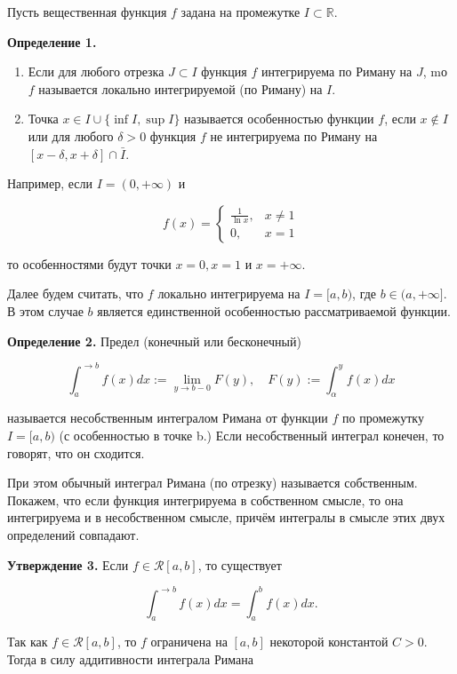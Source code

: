 \documentclass[a4paper,12pt]{article} %
\begin{document}
	Пусть вещественная функция $f$ задана на промежутке $I \subset \mathbb{R}$.
	
	\textbf{Определение 1.}
	\begin{enumerate}
		\item Если для любого отрезка $J \subset I$ функция $f$ интегрируема по Риману на $J$, mо $f$ называется локально интегрируемой (по Риману) на $I$.
	
		\item Точка $x \in I \cup\{\inf I, \sup I\}$ называется особенностью функции $f$, если $x \notin I$ или для любого $\delta>0$ функция $f$ не интегрируема по Риману на $[x-\delta, x+\delta] \cap \bar{I}$.
	
	\end{enumerate}
	
	Например, если $I=(0,+\infty)$ и
	
	$$
	f(x)= \begin{cases}\frac{1}{\ln x}, & x \neq 1 \\ 0, & x=1\end{cases}
	$$
	
	то особенностями будут точки $x=0, x=1$ и $x=+\infty$.
	
	Далее будем считать, что $f$ локально интегрируема на $I=[a, b)$, где $b \in(a,+\infty]$. В этом случае $b$ является единственной особенностью рассматриваемой функции.
	
	\textbf{Определение 2.} Предел (конечный или бесконечный)
	
	$$
	\int_{a}^{\rightarrow b} f(x) d x:=\lim _{y \rightarrow b-0} F(y), \quad F(y):=\int_{\alpha}^{y} f(x) d x
	$$
	
	называется несобственным интегралом Римана от функции $f$ по промежутку $I=[a, b)$ (с особенностью в точке b.) Если несобственный интеграл конечен, то говорят, что он сходится.
	
	При этом обычный интеграл Римана (по отрезку) называется собственным. Покажем, что если функция интегрируема в собственном смысле, то она интегрируема и в несобственном смысле, причём интегралы в смысле этих двух определений совпадают.
	
	\textbf{Утверждение 3.} Если $f \in \mathcal{R}[a, b]$, то существует
	
	$$
	\int_{a}^{\rightarrow b} f(x) d x=\int_{a}^{b} f(x) d x .
	$$
	
	Так как $f \in \mathcal{R}[a, b]$, то $f$ ограничена на $[a, b]$ некоторой константой $C>0$. Тогда в силу аддитивности интеграла Римана
	
\end{document}
